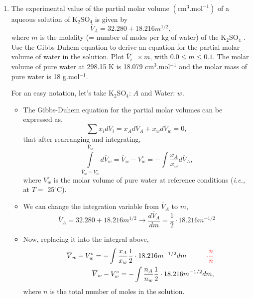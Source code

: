 \documentclass[12pts,a4paper,amsmath,amssymb,floatfix]{article}%
\newcommand{\frc}{\displaystyle\frac}
\newcommand{\red}{\textcolor{red}}
\newcommand{\ie}{{\it i.e., }}
\begin{document}
\begin{enumerate}[1)]
   \item\label{Mod05Ex05} The experimental value of the partial molar volume $\left(\text{cm}^{3}\text{.mol}^{-1}\right)$ of a aqueous solution of K$_{2}$SO$_{4}$ is given by
                \begin{displaymath}
                   \overline{V}_{A} = 32.280 + 18.216 m^{1/2},
                \end{displaymath} 
 where $m$ is the molality (= number of moles per kg of water) of the K$_{2}$SO$_{4}$ . Use the Gibbs-Duhem equation to derive an equation for the partial molar volume of water in the solution. Plot $\overline{V}_{i}\;\;\times m$, with $0.0\leq m\leq 0.1$. The molar volume of pure water at 298.15 K is 18.079 cm$^{3}$.mol$^{-1}$ and the molar mass of pure water is 18 g.mol$^{-1}$.

        For an easy notation, let's take K$_{2}$SO$_{4}$: $A$ and Water: $w$.
\begin{itemize}
  \item The Gibbs-Duhem equation for the partial molar volumes can be expressed as,
     \begin{displaymath}
        \sum\limits x_{i}d\overline{V}_{i} = x_{A} d\overline{V}_{A} + x_{w} d\overline{V}_{w} = 0,
     \end{displaymath}
     that after rearranging and integrating,
     \begin{displaymath}
        \int\limits_{\overline{V}_{w}=V_{w}^{\circ}}^{\overline{V}_{w}}d\overline{V}_{w} = \overline{V}_{w} - V_{w}^{\circ} = -\int\frc{x_{A}}{x_{w}} d\overline{V}_{A},
     \end{displaymath}
     where $V_{w}^{\circ}$ is the molar volume of pure water at reference conditions (\ie at $T=$ 25$^{\circ}$C).

  \item We can change the integration variable from $\overline{V}_{A}$ to $m$,
      \begin{displaymath}
         \overline{V}_{A} = 32.280 + 18.216 m^{1/2} \rightarrow \frc{d\overline{V}_{A}}{dm} = \frc{1}{2}\cdot 18.216 m^{-1/2} 
      \end{displaymath} 
  
  \item Now, replacing it into the integral above,
       \begin{eqnarray}
          && \overline{V}_{w} - V_{w}^{\circ} = -\int\frc{x_{A}}{x_{w}} \frc{1}{2}\cdot 18.216 m^{-1/2} dm \hspace{1cm} \red{\cdot\frc{n}{n}} \nonumber \\
          && \overline{V}_{w} - V_{w}^{\circ} = -\int\frc{n_{A}}{n_{w}} \frc{1}{2}\cdot 18.216 m^{-1/2} dm, \nonumber
       \end{eqnarray}
       where $n$ is the total number of moles in the solution.


\end{itemize}
\end{enumerate}
\end{document}
